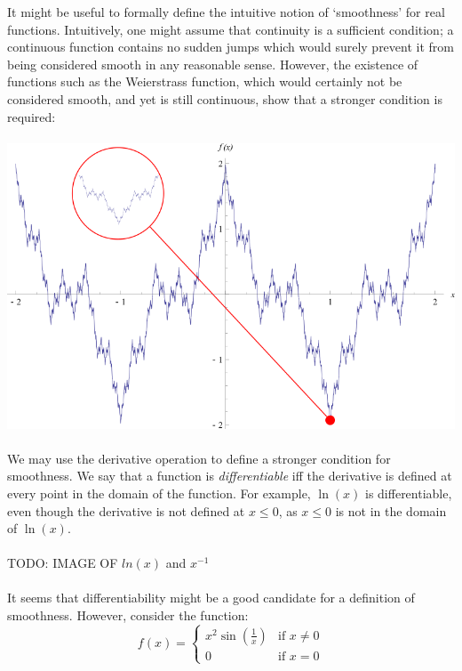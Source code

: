 \documentclass{article}
\author{Aidan Ewart}
\date{\today}
\begin{document}
\maketitle

It might be useful to formally define the intuitive notion of `smoothness' for real functions.
Intuitively, one might assume that continuity is a sufficient condition; a continuous function
contains no sudden jumps which would surely prevent it from being considered smooth in any
reasonable sense. However, the existence of functions such as the Weierstrass function, which
would certainly not be considered smooth, and yet is still continuous, show that a stronger
condition is required:
\\\\
\includegraphics[width=\textwidth]{WeierstrassFunction.png}
\\\\
We may use the derivative operation to define a stronger condition for smoothness. We say
that a function is \emph{differentiable} iff the derivative is defined at every point in the
domain of the function. For example, $\ln(x)$ is differentiable, even though the derivative
is not defined at $x \leq 0$, as $x \leq 0$ is not in the domain of $\ln(x)$.
\\\\
TODO: IMAGE OF $ln(x)$ and $x^{-1}$
\\\\
It seems that differentiability might be a good candidate for a definition of smoothness.
However, consider the function:
$$
f(x) = \left\{ \begin{array}{ll}
    x^2 \sin(\frac{1}{x}) & \mbox{if } x \neq 0 \\
    0 & \mbox{if } x = 0
\end{array} \right.
$$
\end{document}
